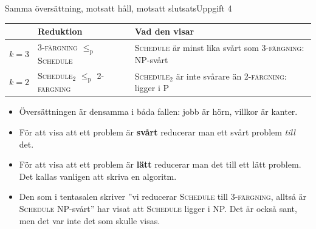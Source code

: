 \documentclass[aspectratio=169,10pt]{beamer}
\newcommand{\prob}[1]{\textsc{#1}}
\newcommand{\lep}{\le_{\mathrm{p}}}
\begin{document}
\begin{frame}{Samma översättning, motsatt håll, motsatt slutsats}{Uppgift 4}
  \centering
  \begin{tabular}{@{}L{1.6cm}L{4.8cm}L{6.2cm}@{}}
    \toprule
     & \textbf{Reduktion} & \textbf{Vad den visar} \\
    \midrule
    $k=3$ & \prob{3-färgning} $\lep$ \prob{Schedule} & \prob{Schedule} är minst lika svårt som \prob{3-färgning}: NP-svårt \\[2mm]
    $k=2$ & \prob{Schedule$_2$} $\lep$ \prob{2-färgning} & \prob{Schedule$_2$} är inte svårare än \prob{2-färgning}: ligger i P \\
    \bottomrule
  \end{tabular}
  \vspace{3mm}
  \begin{itemize}
    \item<2-> Översättningen är densamma i båda fallen: jobb är hörn, villkor är kanter.
    \item<3-> För att visa att ett problem är \textbf{svårt} reducerar man ett svårt problem \emph{till} det.
    \item<4-> För att visa att ett problem är \textbf{lätt} reducerar man det till ett lätt problem. Det kallas vanligen att skriva en algoritm.
    \item<5-> Den som i tentasalen skriver ''vi reducerar \prob{Schedule} till \prob{3-färgning}, alltså är \prob{Schedule} NP-svårt'' har visat att \prob{Schedule} ligger i NP. Det är också sant, men det var inte det som skulle visas.
  \end{itemize}
\end{frame}
\end{document}
